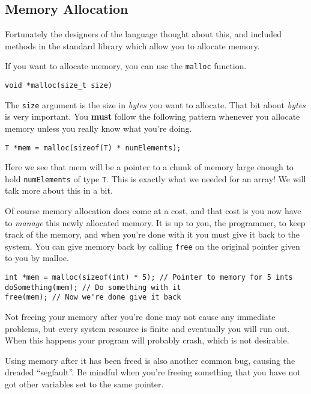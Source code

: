 \subsection{Memory Allocation}

Fortunately the designers of the language thought about this, and included methods in the standard library which allow you to allocate memory.

If you want to allocate memory, you can use the \texttt{malloc} function. 

\begin{lstlisting}[numbers=none,frame=none]
void *malloc(size_t size)
\end{lstlisting}

The \texttt{size} argument is the size in \emph{bytes} you want to allocate.
That bit about \emph{bytes} is very important.
You \textbf{must} follow the following pattern whenever you allocate memory unless you really know what you're doing.

\begin{lstlisting}[numbers=none,frame=none]
T *mem = malloc(sizeof(T) * numElements);
\end{lstlisting}

Here we see that mem will be a pointer to a chunk of memory large enough to hold \texttt{numElements} of type \texttt{T}.
This is exactly what we needed for an array!
We will talk more about this in a bit.

Of course memory allocation does come at a cost, and that cost is you now have to \emph{manage} this newly allocated memory.
It is up to you, the programmer, to keep track of the memory, and when you're done with it you must give it back to the system.
You can give memory back by calling \texttt{free} on the original pointer given to you by malloc.

\begin{lstlisting}
int *mem = malloc(sizeof(int) * 5); // Pointer to memory for 5 ints
doSomething(mem); // Do something with it
free(mem); // Now we're done give it back
\end{lstlisting}

Not freeing your memory after you're done may not cause any immediate problems, but every system resource is finite and eventually you will run out.
When this happens your program will probably crash, which is not desirable.

Using memory after it has been freed is also another common bug, causing the dreaded ``segfault''.
Be mindful when you're freeing something that you have not got other variables set to the same pointer.

